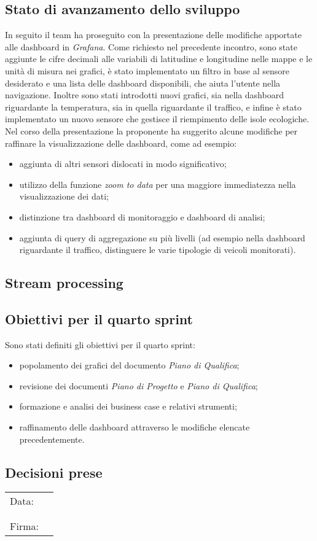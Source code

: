 \documentclass[italian,12pt]{article}
\begin{document}
\subsection{Stato di avanzamento dello sviluppo}
In seguito il team ha proseguito con la presentazione delle modifiche apportate alle dashboard in \textit{Grafana}. Come richiesto nel precedente
incontro, sono state aggiunte le cifre decimali alle variabili di latitudine e longitudine nelle mappe e le unità di misura nei grafici,
è stato implementato un filtro in base al sensore desiderato e una lista delle dashboard disponibili, che aiuta l'utente nella navigazione.
Inoltre sono stati introdotti nuovi grafici, sia nella dashboard riguardante la temperatura, sia in quella riguardante il traffico, e infine
è stato implementato un nuovo sensore che gestisce il riempimento delle isole ecologiche. Nel corso della presentazione la proponente ha suggerito
alcune modifiche per raffinare la visualizzazione delle dashboard, come ad esempio:
\begin{itemize}
	\item aggiunta di altri sensori dislocati in modo significativo;
	\item utilizzo della funzione \textit{zoom to data} per una maggiore immediatezza nella visualizzazione dei dati;
	\item distinzione tra dashboard di monitoraggio e dashboard di analisi;
	\item aggiunta di query di aggregazione su più livelli
	(ad esempio nella dashboard riguardante il traffico, distinguere le varie tipologie di veicoli monitorati).
\end{itemize}

\newpage
\subsection{Stream processing}

\subsection{Obiettivi per il quarto sprint}
Sono stati definiti gli obiettivi per il quarto sprint:
\begin{itemize}
	\item popolamento dei grafici del documento \textit{Piano di Qualifica};
	\item revisione dei documenti \textit{Piano di Progetto} e \textit{Piano di Qualifica};
	\item formazione e analisi dei business case e relativi strumenti;
	\item raffinamento delle dashboard attraverso le modifiche elencate precedentemente.
\end{itemize}

\subsection{Decisioni prese}

\newpage
\begin{table}[b]
	\begin{tabular}{@{}p{.5in}p{4in}@{}}
		Data:  & \hrulefill \\
		       &            \\
		       &            \\
		Firma: & \hrulefill \\
	\end{tabular}
\end{table}
\end{document}
